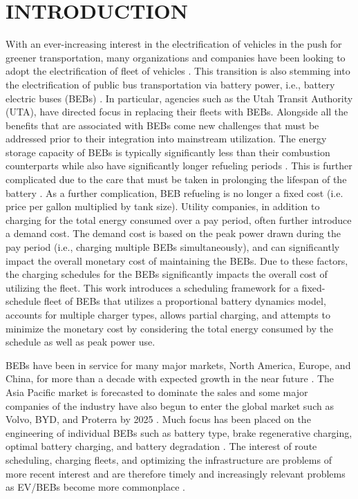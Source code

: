 \documentclass[ee,thesis]{usuthesis}
\begin{document}
\body  %

\chapter{INTRODUCTION}
\label{sec:introduction}
With an ever-increasing interest in the electrification of vehicles in the push for greener transportation, many
organizations and companies have been looking to adopt the electrification of fleet of vehicles \cite{khan-2022-inves}.
This transition is also stemming into the electrification of public bus transportation via battery power, i.e., battery
electric buses (BEBs) \cite{li-2016-batter-elect,guida-2017-zeeus-repor-europ}. In particular, agencies such as the
Utah Transit Authority (UTA), have directed focus in replacing their fleets with BEBs. Alongside all the benefits that
are associated with BEBs come new challenges that must be addressed prior to their integration into mainstream
utilization. The energy storage capacity of BEBs is typically significantly less than their combustion counterparts
while also have significantly longer refueling periods \cite{xylia-2018-role-charg,li-2016-batter-elect}. This is
further complicated due to the care that must be taken in prolonging the lifespan of the battery
\cite{lutsey-2019-updat-elect,edge-2021-lithium,millner-2010-model-lithium}. As a further complication, BEB
refueling is no longer a fixed cost (i.e. price per gallon multiplied by tank size). Utility companies, in addition to
charging for the total energy consumed over a pay period, often further introduce a demand cost. The demand cost is
based on the peak power drawn during the pay period (i.e., charging multiple BEBs simultaneously), and can significantly
impact the overall monetary cost of maintaining the BEBs. Due to these factors, the charging schedules for the BEBs
significantly impacts the overall cost of utilizing the fleet. This work introduces a scheduling framework for a
fixed-schedule fleet of BEBs that utilizes a proportional battery dynamics model, accounts for multiple charger types,
allows partial charging, and attempts to minimize the monetary cost by considering the total energy consumed by the
schedule as well as peak power use.

BEBs have been in service for many major markets, North America, Europe, and China, for more than a decade with expected
growth in the near future \cite{deng-2021-survey-elect}. The Asia Pacific market is forecasted to dominate the sales
and some major companies of the industry have also begun to enter the global market such as Volvo, BYD, and Proterra by
2025 \cite{deng-2021-survey-elect}. Much focus has been placed on the engineering of individual BEBs such as battery
type, brake regenerative charging, optimal battery charging, and battery degradation \cite{chen-2008-desig-grey,abdollahi-2016-optim-batter,kuhne-2010-elect,deng-2021-survey-elect}. The interest of route scheduling, charging
fleets, and optimizing the infrastructure are problems of more recent interest and are therefore timely and increasingly
relevant problems as EV/BEBs become more commonplace \cite{hoke-2014-accoun-lithium,sebastiani-2016-evaluat-elect,wei-2018-optim-spatio}.
\end{document}
